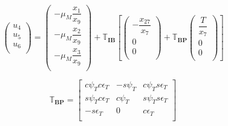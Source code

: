 \begin{equation} \label{eq:accAux}
\begin{pmatrix}
u_{4}\\
u_{5}\\
u_{6}\\
\end{pmatrix}
=
\begin{pmatrix}
-\mu_{M}\dfrac{x_{1}}{x_{9}}\\
-\mu_{M}\dfrac{x_{2}}{x_{9}}\\
-\mu_{M}\dfrac{x_{3}}{x_{9}}\\
\end{pmatrix}+
\mathbb{T}_{\mathbf{IB}}\left[
\begin{pmatrix}
-\dfrac{x_{27}}{x_{7}}\\
0\\
0\\
\end{pmatrix}
+ 
\mathbb{T}_{\mathbf{BP}}
\begin{pmatrix}
\dfrac{T}{x_{7}}\\
0\\
0\\
\end{pmatrix}
\right]
\end{equation}


\begin{equation} \label{eq:BPtrans}
\mathbb{T}_{\mathbf{BP}}=
\begin{bmatrix}
c\psi_{T}c\epsilon_{T} & -s\psi_{T} & c\psi_{T}s\epsilon_{T}\\
s\psi_{T}c\epsilon_{T} & c\psi_{T} & s\psi_{T}s\epsilon_{T}\\
-s\epsilon_{T} & 0 & c\epsilon_{T}\\
\end{bmatrix}
\end{equation}

